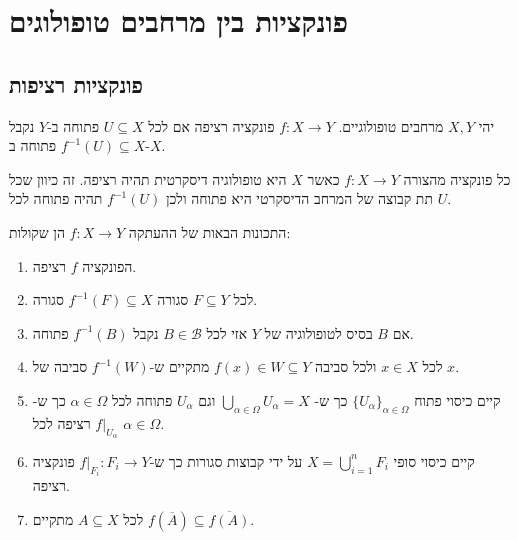 \documentclass{tstextbook}
\begin{document}
\chapter{פונקציות בין מרחבים טופולוגים}

\section{פונקציות רציפות}

\begin{definition}
יהי \(X,Y\) מרחבים טופולוגיים. \(f:X\to Y\) פונקציה רציפה אם לכל \(U \subseteq X\) פתוחה ב-\(Y\) נקבל \(f^{-1}(U)\subseteq X\) פתוחה ב-\(X\).

\end{definition}
\begin{example}
כל פונקציה מהצורה \(f:X\to Y\) כאשר \(X\) היא טופולוגיה דיסקרטית תהיה רציפה. זה כיוון שכל תת קבוצה של המרחב הדיסקרטי היא פתוחה ולכן \(f^{-1}(U)\) תהיה פתוחה לכל \(U\).

\end{example}
\begin{proposition}
התכונות הבאות של ההעתקה \(f:X\to Y\) הן שקולות:

  \begin{enumerate}
    \item הפונקציה \(f\) רציפה. 


    \item לכל \(F\subseteq Y\) סגורה \(f^{-1}(F)\subseteq X\) סגורה. 


    \item אם \(B\) בסיס לטופולוגיה של \(Y\) אזי לכל \(B \in \mathcal{B}\) נקבל \(f^{-1}(B)\) פתוחה. 


    \item לכל \(x \in X\) ולכל סביבה \(f(x) \in W\subseteq Y\) מתקיים ש-\(f^{-1}(W)\) סביבה של \(x\). 


    \item קיים כיסוי פתוח \(\{ U_{\alpha} \}_{\alpha \in \Omega}\) כך ש- \(\bigcup_{\alpha \in \Omega}U_{\alpha}=X\) וגם \(U_{\alpha}\) פתוחה לכל \(\alpha \in \Omega\) כך ש-\(f|_{U_{\alpha}}\) רציפה לכל \(\alpha \in \Omega\). 


    \item קיים כיסוי סופי \(X=\bigcup_{i=1}^{n}F_{i}\) על ידי קבוצות סגורות כך ש-\(f|_{F_{i}}:F_{i}\to Y\) פונקציה רציפה. 


    \item לכל \(A\subseteq X\) מתקיים \(f(\overline{A})\subseteq \overline{f(A)}\). 


  \end{enumerate}
\end{proposition}
\end{document}
